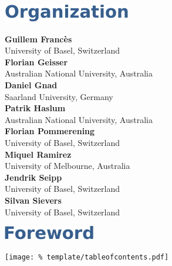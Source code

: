 \documentclass[letterpaper]{article}
\begin{document}

\cleardoublepage

\vspace*{5mm}
\includegraphics[trim={15pt 0pt 0pt 0pt}]{template/organization.pdf}






\vspace*{14mm}
\noindent
\textbf{Guillem Franc\`es}\\
University of Basel, Switzerland\\[1em]
\textbf{Florian Geisser}\\
Australian National University, Australia\\[1em]
\textbf{Daniel Gnad}\\
Saarland University, Germany\\[1em]
\textbf{Patrik Haslum}\\ 
Australian National University, Australia\\[1em]
\textbf{Florian Pommerening}\\
University of Basel, Switzerland\\[1em]
\textbf{Miquel Ramirez}\\
University of Melbourne, Australia\\[1em]
\textbf{Jendrik Seipp}\\ 
University of Basel, Switzerland\\[1em]
\textbf{Silvan Sievers}\\ 
University of Basel, Switzerland

\clearpage

\vspace*{5mm}
\includegraphics[trim={15pt 0pt 0pt 0pt}]{template/preface.pdf}


\clearpage

\vspace*{5mm}
\texttt{[image: \%
 template/tableofcontents.pdf]}

\renewcommand\contentsname{}
\tableofcontents

\cleardoublepage
{}

\end{document}
